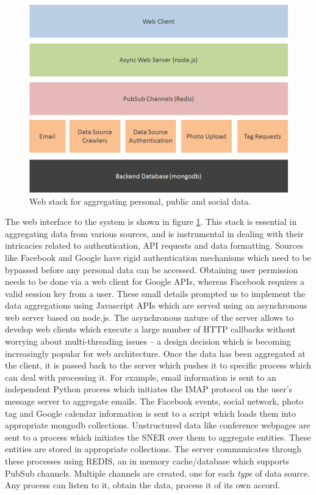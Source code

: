 \begin{figure}[h]
\centering
\includegraphics[width=\textwidth]{media/chapter4/web-stack.png}
\caption{Web stack for aggregating personal, public and social data.}
\label{fig:web-stack}
\end{figure}

The web interface to the system is shown in figure \ref{fig:web-stack}. This stack is essential in aggregating data from various sources, and is instrumental in dealing with their intricacies related to authentication, API requests and data formatting. Sources like Facebook and Google have rigid authentication mechanisms which need to be bypassed before any personal data can be accessed. Obtaining user permission needs to be done via a web client for Google APIs, whereas Facebook requires a valid session key from a user. These small details prompted us to implement the data aggregations using Javascript APIs which are served using an asynchronous web server based on node.js. The asynchronous nature of the server allows to develop web clients which execute a large number of HTTP callbacks without worrying about multi-threading issues -- a design decision which is becoming increasingly popular for web architecture. Once the data has been aggregated at the client, it is passed back to the server which pushes it to specific process which can deal with processing it. For example, email information is sent to an independent Python process which initiates the IMAP protocol on the user's message server to aggregate emails. The Facebook events, social network, photo tag and Google calendar information is sent to a script which loads them into appropriate mongodb collections. Unstructured data like conference webpages are sent to a process which initiates the SNER over them to aggregate entities. These entities are stored in appropriate collections. The server communicates through these processes using REDIS, an in memory cache/database which supports PubSub channels. Multiple channels are created, one for each \textit{type} of data source. Any process can listen to it, obtain the data, process it of its own accord.

